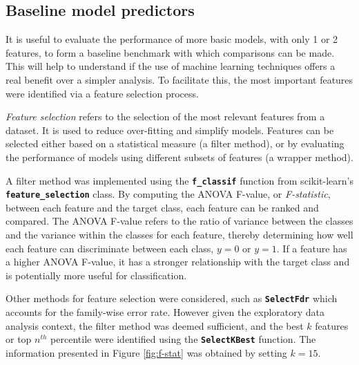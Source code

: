 
\subsection{Baseline model predictors}

\label{feature-selection}

It is useful to evaluate the performance of more basic models, with only 1 or 2 features, to form a baseline benchmark with which comparisons can be made. This will help to understand if the use of machine learning techniques offers a real benefit over a simpler analysis. To facilitate this, the most important features were identified via a feature selection process.

\textit{Feature selection} refers to the selection of the most relevant features from a dataset. It is used to reduce over-fitting and simplify models. Features can be selected either based on a statistical measure (a filter method), or by evaluating the performance of models using different subsets of features (a wrapper method).

A filter method was implemented using the \texttt{\textbf{f\_classif}} function from scikit-learn's \texttt{\textbf{feature\_selection}} class. By computing the ANOVA F-value, or \textit{F-statistic}, between each feature and the target class, each feature can be ranked and compared. The ANOVA F-value refers to the ratio of variance between the classes and the variance within the classes for each feature, thereby determining how well each feature can discriminate between each class, $y=0$ or $y=1$. If a feature has a higher ANOVA F-value, it has a stronger relationship with the target class and is potentially more useful for classification.

Other methods for feature selection were considered, such as \texttt{\textbf{SelectFdr}} which accounts for the family-wise error rate. However given the exploratory data analysis context, the filter method was deemed sufficient, and the best $k$ features or top $n^{th}$ percentile were identified using the \texttt{\textbf{SelectKBest}} function. The information presented in Figure \ref{fig:f-stat} was obtained by setting $k = 15$. 
\clearpage

